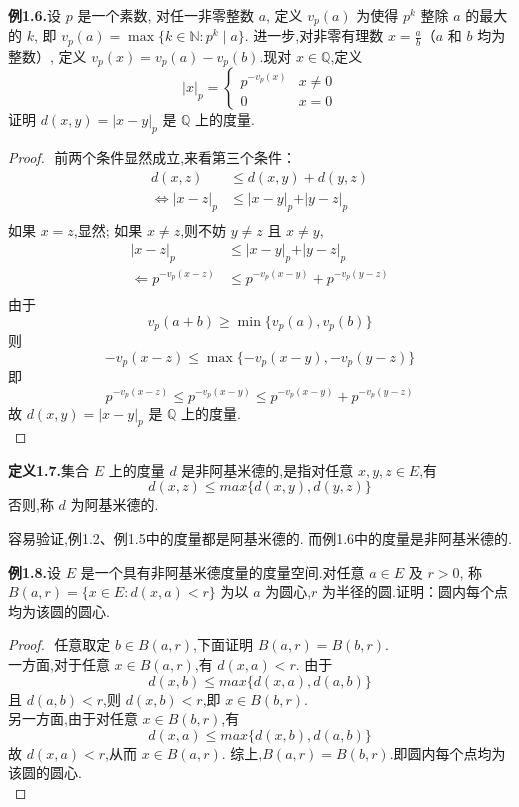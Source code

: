 \documentclass[12pt]{article}
\begin{document}
\textbf{例1.6.}设 $p$ 是一个素数,
对任一非零整数 $a$,
定义 $v_p(a)$ 为使得 $p^k$ 整除 $a$ 的最大的 $k$,
即 $v_p(a) = \max\{k\in\mathbb{N}: p^k\mid a\}$.
进一步,对非零有理数 $x = \frac{a}{b}$（$a$ 和 $b$ 均为整数）,
定义 $v_p(x) = v_p(a) - v_p(b)$.现对 $x\in\mathbb{Q}$,定义
$$\vert x\vert_p = \begin{cases} p^{-v_p(x)} & x\neq 0 \\ 0 & x=0 \end{cases}$$
证明 $d(x,y) = \vert x-y\vert_p$ 是 $\mathbb{Q}$ 上的度量.

\begin{proof}
    $ $
    前两个条件显然成立,来看第三个条件：
    \begin{align*}
        d(x,z) &\leq d(x,y) + d(y,z) \\
        \iff \vert x-z\vert_p &\leq \vert x-y\vert_p + \vert y-z\vert_p \\
    \end{align*}
    如果 $x= z$,显然;
    如果 $x\neq z$,则不妨 $y\neq z$ 且 $x\neq y$,
    \begin{align*}
        \vert x-z\vert_p &\leq \vert x-y\vert_p + \vert y-z\vert_p \\
        \Longleftarrow p^{-v_p(x-z)} &\leq p^{-v_p(x-y)} + p^{-v_p(y-z)} \\
    \end{align*}
    由于
    \[v_p(a+b)\geq \min\{v_p(a),v_p(b)\}\]
    则
    \[-v_p(x-z)\leq \max\{-v_p(x-y),-v_p(y-z)\}\]
    即
    \[p^{-v_p(x-z)}\leq p^{-v_p(x-y)} \leq p^{-v_p(x-y)} + p^{-v_p(y-z)}\]
    故 $d(x,y) = \vert x-y\vert_p$ 是 $\mathbb{Q}$ 上的度量.\\
\end{proof}

\textbf{定义1.7.}集合 $E$ 上的度量 $d$ 是非阿基米德的,是指对任意 $x,y,z\in E$,有
$$d(x,z) \leq max\{d(x,y),d(y,z)\}$$
否则,称 $d$ 为阿基米德的.

容易验证,例1.2、例1.5中的度量都是阿基米德的.
而例1.6中的度量是非阿基米德的.

\textbf{例1.8.}设 $E$ 是一个具有非阿基米德度量的度量空间.对任意 $a\in E$ 及 $r>0$,
称 $B(a,r) = \{x\in E: d(x,a)<r\}$ 为以 $a$ 为圆心,$r$ 为半径的圆.证明：圆内每个点均为该圆的圆心.
\begin{proof}
    $ $
    任意取定 $b\in B(a,r)$,下面证明 $B(a,r) = B(b,r)$.\\
    一方面,对于任意 $x\in B(a,r)$,有 $d(x,a)<r$.
    由于
    \[d(x,b)\leq max\{d(x,a),d(a,b)\}\]
    且 $d(a,b)<r$,则 $d(x,b) < r$,即 $x\in B(b,r)$.\\
    另一方面,由于对任意 $x\in B(b,r)$,有
    \[d(x,a) \leq max\{d(x,b),d(a,b)\}\]
    故 $d(x,a) < r$,从而 $x\in B(a,r)$.
    综上,$B(a,r) = B(b,r)$.即圆内每个点均为该圆的圆心.\\
\end{proof}
\end{document}
